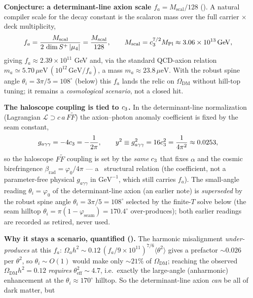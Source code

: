 \par\smallskip\noindent\textbf{Conjecture: a determinant-line axion scale $f_a=M_{\mathrm{scal}}/128$} (\mC).
A natural compiler scale for the decay constant is the scalaron mass over the full carrier $\times$ deck
multiplicity,
\[
  f_a=\frac{M_{\mathrm{scal}}}{2\,\dim S^+\,|\mu_4|}=\frac{M_{\mathrm{scal}}}{128},\qquad
  M_{\mathrm{scal}}=c_3^{7/2}M_{\mathrm{Pl}}\approx3.06\times10^{13}\,\mathrm{GeV},
\]
giving $f_a\approx2.39\times10^{11}$ GeV and, via the standard QCD-axion relation
$m_a\simeq5.70\,\mu\mathrm{eV}\,(10^{12}\,\mathrm{GeV}/f_a)$, a mass $m_a\approx23.8\,\mu\mathrm{eV}$.
With the robust spine angle $\theta_i=3\pi/5=108^\circ$ (below) this $f_a$ lands the relic on
$\Omega_{\mathrm{DM}}$ without hill-top tuning; it remains a \emph{cosmological scenario}, not a closed
hit. 
\par\smallskip\noindent\textbf{The haloscope coupling is tied to $c_3$.} In the determinant-line
normalization (Lagrangian $\mathcal L\supset c\,a\,F\tilde F$) the axion--photon anomaly coefficient is fixed
by the seam constant,
\[
  g_{a\gamma\gamma}=-4c_3=-\frac{1}{2\pi},\qquad y^2\equiv g_{a\gamma\gamma}^2=16c_3^2=\frac{1}{4\pi^2}\approx0.0253,
\]
so the haloscope $F\tilde F$ coupling is set by the \emph{same} $c_3$ that fixes $\alpha$ and the cosmic
birefringence $\beta_{\mathrm{rad}}=\varphi_0/4\pi$ --- a \mC\ structural relation (the coefficient, not a
parameter-free physical $g_{a\gamma\gamma}$ in $\mathrm{GeV}^{-1}$, which still carries $f_a$). The
small-angle reading $\theta_i=\varphi_0$ of the determinant-line axion (an earlier note) is \emph{superseded}
by the robust spine angle $\theta_i=3\pi/5=108^\circ$ selected by the finite-$T$ solve below (the seam
hilltop $\theta_i=\pi(1-\varphi_{\mathrm{seam}})=170.4^\circ$ over-produces); both earlier readings are
recorded as retired, never used.
\par\smallskip\noindent\textbf{Why it stays a scenario, quantified ().}
The harmonic misalignment \emph{under-produces} at this $f_a$: $\Omega_a h^2\sim0.12\,(f_a/9{\times}10^{11})^{7/6}\langle\theta^2\rangle$
gives a prefactor ${\sim}0.026$ per $\theta^2$, so $\theta_i\sim O(1)$ would make only ${\sim}21\%$ of
$\Omega_{\mathrm{DM}}$; reaching the observed $\Omega_{\mathrm{DM}}h^2=0.12$ \emph{requires}
$\theta_{\mathrm{eff}}^2\sim4.7$, i.e.\ exactly the large-angle (anharmonic) enhancement at the
$\theta_i\approx170^\circ$ hilltop. So the determinant-line axion \emph{can} be all of dark matter, but

